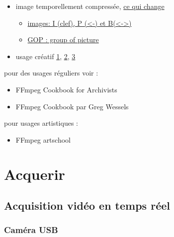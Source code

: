 \documentclass[
]{book}
\providecommand{\tightlist}{%
  \setlength{\itemsep}{0pt}\setlength{\parskip}{0pt}}
\begin{document}
\begin{itemize}
\tightlist
\item
  image temporellement compressée, \href{http://dvd-hq.info/data_compression_3.php}{ce qui change}

  \begin{itemize}
  \tightlist
  \item
    \href{https://en.wikipedia.org/wiki/Video_compression_picture_types}{images: I (clef), P (\textless-) et B(\textless-\textgreater)}
  \item
    \href{https://en.wikipedia.org/wiki/Inter_frame\#/media/File:IPB_images_sequence.png}{GOP : group of picture}
  \end{itemize}
\item
  usage créatif \href{https://www.youtube.com/watch?v=rMSsw4CZvKg}{1}, \href{https://www.youtube.com/watch?v=rSmEOk5AiN0}{2}, \href{https://www.youtube.com/watch?v=dNa0-xrKi3Q}{3}
\end{itemize}

pour des usages réguliers voir :

\begin{itemize}
\tightlist
\item
  FFmpeg Cookbook for Archivists \citep{kromer_FFmpegCookbookArchivists_2020}
\item
  FFmpeg Cookbook par Greg Wessels \citep{wessels_FFmpegCookbook_2017}
\end{itemize}

pour usages artistiques :

\begin{itemize}
\tightlist
\item
  FFmpeg artschool \citep{associationofmovingimagearchivists_FFmpegArtschool_2020}
\end{itemize}

\hypertarget{acquerir}{%
\chapter{Acquerir}\label{acquerir}}

\hypertarget{acquerir_captation}{%
\section{Acquisition vidéo en temps réel}\label{acquerir_captation}}

\hypertarget{camuxe9ra-usb}{%
\subsection{Caméra USB}\label{camuxe9ra-usb}}
\end{document}
